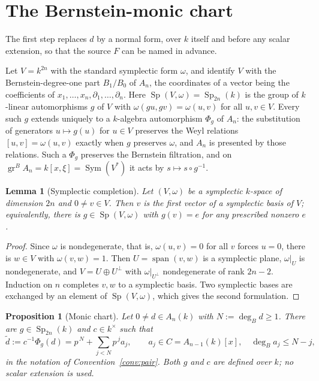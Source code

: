 \documentclass[11pt]{article}
\theoremstyle{plain}
\newtheorem{lemma}[theorem]{Lemma}
\newtheorem{proposition}[theorem]{Proposition}
\theoremstyle{definition}
\theoremstyle{remark}
\theoremstyle{plain}
\newcommand{\gr}{\operatorname{gr}}
\newcommand{\Sp}{\operatorname{Sp}}
\newcommand{\backtomap}{%
  \hfill\raisebox{0.15ex}{\footnotesize\hyperref[fig:map]{$\uparrow$\,proof map}}}
\newcommand{\nodehead}[2]{%
  \section{#2}\label{sec:#1}%
  \nopagebreak\noindent{\footnotesize\ttfamily\color{csoft}#1}\backtomap\par
  \nopagebreak\vspace{0.6ex}}
\begin{document}
\nodehead{monic-chart}{The Bernstein-monic chart}

The first step replaces $d$ by a normal form, over $k$ itself and before any
scalar extension, so that the source $F$ can be named in advance.

Let $V=k^{2n}$ with the standard symplectic form $\omega$, and identify $V$
with the Bernstein-degree-one part $B_1/B_0$ of $A_n$, the coordinates of a
vector being the coefficients of $x_1,\dots,x_n,\partial_1,\dots,\partial_n$.
Here $\Sp(V,\omega)=\Sp_{2n}(k)$ is the group of $k$-linear automorphisms
$g$ of $V$ with $\omega(gu,gv)=\omega(u,v)$ for all $u,v\in V$. Every such $g$
extends uniquely to a $k$-algebra automorphism $\Phi_g$ of $A_n$: the
substitution of generators $u\mapsto g(u)$ for $u\in V$ preserves the Weyl
relations $[u,v]=\omega(u,v)$ exactly when $g$ preserves $\omega$, and $A_n$
is presented by those relations.
Such a $\Phi_g$ preserves the Bernstein filtration, and on
$\gr^BA_n=k[x,\xi]=\operatorname{Sym}(V^*)$ it acts by $s\mapsto s\circ g^{-1}$.

\begin{lemma}[Symplectic completion]\label{lem:sympcompl}
Let $(V,\omega)$ be a symplectic $k$-space of dimension $2n$ and $0\neq v\in V$.
Then $v$ is the first vector of a symplectic basis of $V$; equivalently, there
is $g\in\Sp(V,\omega)$ with $g(v)=e$ for any prescribed nonzero $e$.
\end{lemma}

\begin{proof}
Since $\omega$ is nondegenerate, that is, $\omega(u,v)=0$ for all $v$ forces
$u=0$, there is $w\in V$ with $\omega(v,w)=1$. Then
$U=\operatorname{span}(v,w)$ is a symplectic plane, $\omega|_U$ is
nondegenerate, and $V=U\oplus U^{\perp}$ with $\omega|_{U^\perp}$
nondegenerate of rank $2n-2$. Induction on $n$ completes $v,w$ to a symplectic
basis. Two symplectic bases are exchanged by an element of $\Sp(V,\omega)$,
which gives the second formulation.
\end{proof}

\begin{proposition}[Monic chart]\label{prop:monic}
Let $0\neq d\in A_n(k)$ with $N:=\deg_B d\ge1$. There are $g\in\Sp_{2n}(k)$ and
$c\in k^{\times}$ such that
\[
  \tilde d:=c^{-1}\Phi_g(d)=p^{\,N}+\sum_{j<N}p^{\,j}a_j,
  \qquad a_j\in C=A_{n-1}(k)[x],\quad \deg_B a_j\le N-j,
\]
in the notation of Convention~\ref{conv:pair}. Both $g$ and $c$ are defined
over $k$; no scalar extension is used.
\end{proposition}
\end{document}

